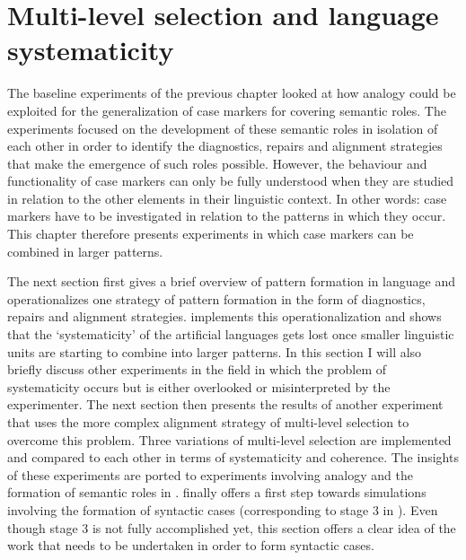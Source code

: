 
\setcounter{chapter}{3}
\chapter{Multi-level selection and language systematicity}
\label{c:experiment1}

The baseline experiments of the previous chapter looked at how analogy could be exploited for the generalization of case markers for covering semantic roles. The experiments focused on the development of these semantic roles in isolation of each other in order to identify the diagnostics, repairs and alignment strategies that make the emergence of such roles possible. However, the behaviour and functionality of case markers can only be fully understood when they are studied in relation to the other elements in their linguistic context. In other words: case markers have to be investigated in relation to the patterns in which they occur. This chapter therefore presents experiments in which case markers can be combined in larger patterns.

The next section first gives a brief overview of pattern formation in language and operationalizes one strategy of pattern formation in the form of diagnostics, repairs and alignment strategies.  implements this operationalization and shows that the `systematicity' of the artificial languages gets lost once smaller linguistic units are starting to combine into larger patterns. In this section I will also briefly discuss other experiments in the field in which the problem of systematicity occurs but is either overlooked or misinterpreted by the experimenter. The next section then presents the results of another experiment that uses the more complex alignment strategy of multi-level selection to overcome this problem. Three variations of multi-level selection are implemented and compared to each other in terms of systematicity and coherence. The insights of these experiments are ported to experiments involving analogy and the formation of semantic roles in .  finally offers a first step towards simulations involving the formation of syntactic cases (corresponding to stage 3 in ). Even though stage 3 is not fully accomplished yet, this section offers a clear idea of the work that needs to be undertaken in order to form syntactic cases.


